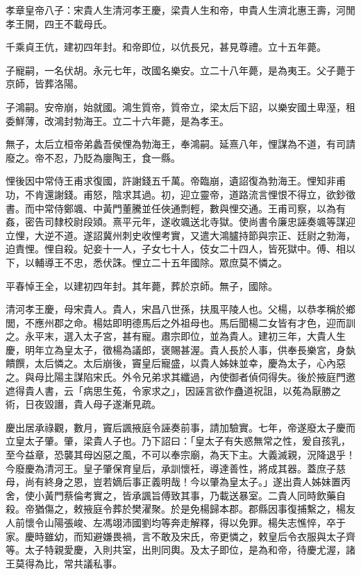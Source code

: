 
\begin{pinyinscope}
孝章皇帝八子：宋貴人生清河孝王慶，梁貴人生和帝，申貴人生濟北惠王壽，河閒孝王開，四王不載母氏。

千乘貞王伉，建初四年封。和帝即位，以伉長兄，甚見尊禮。立十五年薨。

子寵嗣，一名伏胡。永元七年，改國名樂安。立二十八年薨，是為夷王。父子薨于京師，皆葬洛陽。

子鴻嗣。安帝崩，始就國。鴻生質帝，質帝立，梁太后下詔，以樂安國土卑溼，租委鮮薄，改鴻封勃海王。立二十六年薨，是為孝王。

無子，太后立桓帝弟蠡吾侯悝為勃海王，奉鴻嗣。延熹八年，悝謀為不道，有司請廢之。帝不忍，乃貶為廮陶王，食一縣。

悝後因中常侍王甫求復國，許謝錢五千萬。帝臨崩，遺詔復為勃海王。悝知非甫功，不肯還謝錢。甫怒，陰求其過。初，迎立靈帝，道路流言悝恨不得立，欲鈔徵書。而中常侍鄭颯、中黃門董騰並任俠通剽輕，數與悝交通。王甫司察，以為有姦，密告司隸校尉段熲。熹平元年，遂收颯送北寺獄。使尚書令廉忠誣奏颯等謀迎立悝，大逆不道。遂詔冀州刺史收悝考實，又遣大鴻臚持節與宗正、廷尉之勃海，迫責悝。悝自殺。妃妾十一人，子女七十人，伎女二十四人，皆死獄中。傅、相以下，以輔導王不忠，悉伏誅。悝立二十五年國除。眾庶莫不憐之。

平春悼王全，以建初四年封。其年薨，葬於京師。無子，國除。

清河孝王慶，母宋貴人。貴人，宋昌八世孫，扶風平陵人也。父楊，以恭孝稱於鄉閭，不應州郡之命。楊姑即明德馬后之外祖母也。馬后聞楊二女皆有才色，迎而訓之。永平末，選入太子宮，甚有寵。肅宗即位，並為貴人。建初三年，大貴人生慶，明年立為皇太子，徵楊為議郎，褒賜甚渥。貴人長於人事，供奉長樂宮，身埶饋饌，太后憐之。太后崩後，竇皇后寵盛，以貴人姊妹並幸，慶為太子，心內惡之。與母比陽主謀陷宋氏。外令兄弟求其纖過，內使御者偵伺得失。後於掖庭門邀遮得貴人書，云「病思生菟，令家求之」，因誣言欲作蠱道祝詛，以菟為厭勝之術，日夜毀譖，貴人母子遂漸見疏。

慶出居承祿觀，數月，竇后諷掖庭令誣奏前事，請加驗實。七年，帝遂廢太子慶而立皇太子肇。肇，梁貴人子也。乃下詔曰：「皇太子有失惑無常之性，爰自孩乳，至今益章，恐襲其母凶惡之風，不可以奉宗廟，為天下主。大義滅親，況降退乎！今廢慶為清河王。皇子肇保育皇后，承訓懷衽，導達善性，將成其器。蓋庶子慈母，尚有終身之恩，豈若嫡后事正義明哉！今以肇為皇太子。」遂出貴人姊妹置丙舍，使小黃門蔡倫考實之，皆承諷旨傅致其事，乃載送暴室。二貴人同時飲藥自殺。帝猶傷之，敕掖庭令葬於樊濯聚。於是免楊歸本郡。郡縣因事復捕繫之，楊友人前懷令山陽張峻、左馮翊沛國劉均等奔走解釋，得以免罪。楊失志憔悴，卒于家。慶時雖幼，而知避嫌畏禍，言不敢及宋氏，帝更憐之，敕皇后令衣服與太子齊等。太子特親愛慶，入則共室，出則同輿。及太子即位，是為和帝，待慶尤渥，諸王莫得為比，常共議私事。


\end{pinyinscope}
